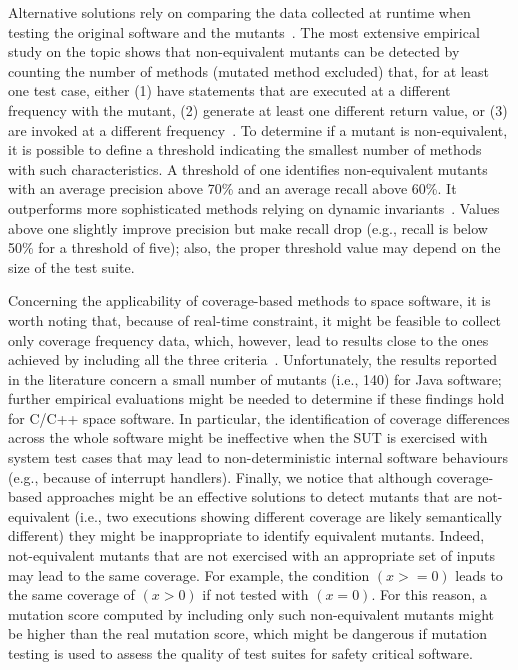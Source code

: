 Alternative solutions rely on comparing the data collected at runtime when testing the original software and the mutants~\cite{grun2009impact,schuler2010covering,schuler2013covering}.
The most extensive empirical study on the topic shows that non-equivalent mutants can be detected by counting the number of methods (mutated method excluded) that, for at least one test case, either (1) have statements that are executed at a different frequency with the mutant, (2) generate at least one different return value, or (3) are invoked at a different frequency~\cite{schuler2013covering}. To determine if a mutant is non-equivalent, it is possible to define a threshold indicating the smallest number of methods with such characteristics. A threshold of one identifies non-equivalent mutants with an average precision above 70\% and an average recall above 60\%. It outperforms more sophisticated methods relying on dynamic invariants~\cite{schuler2009efficient}.
Values above one slightly improve precision but make recall drop (e.g., recall is below 50\% for a threshold of five); also, the proper threshold value may depend on the size of the test suite.

Concerning the applicability of coverage-based methods to space software, it is worth noting that, because of real-time constraint, it might be feasible to collect only coverage frequency data, which, however, lead to results close to the ones achieved by including all the three criteria~\cite{schuler2013covering}.
Unfortunately, the  results reported in the literature concern a small number of mutants (i.e., 140) for Java software; further empirical evaluations might be needed to determine if these findings hold for C/C++ space software.
In particular, the identification of coverage differences across the whole software might be ineffective when the SUT is exercised with system test cases that may lead to non-deterministic internal software behaviours (e.g., because of interrupt handlers). Finally, we notice that although coverage-based approaches might be an effective solutions to detect mutants that are not-equivalent (i.e., two executions showing different coverage are likely semantically different) they might be inappropriate to identify equivalent mutants. Indeed, not-equivalent mutants that are not exercised with an appropriate set of inputs may lead to the same coverage. For example, the condition $(x >= 0)$ leads to the same coverage of $(x > 0)$ if not tested with $(x=0)$. For this reason, a mutation score computed by including only such non-equivalent mutants might be higher than the real mutation score, which might be dangerous if mutation testing is used to assess the quality of test suites for safety critical software.

